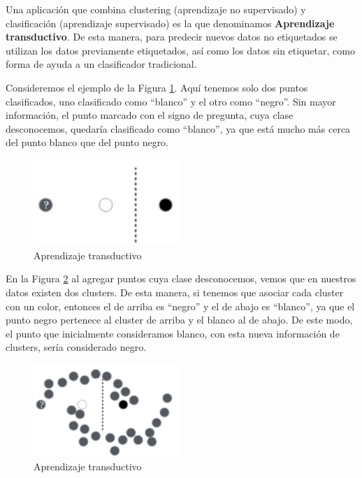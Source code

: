 \documentclass[12pt,a4paper]{article}
\begin{document}
\begin{sloppypar}
Una aplicación que combina clustering (aprendizaje no supervisado) y clasificación (aprendizaje supervisado) es la que denominamos \textbf{Aprendizaje transductivo}\cite{aprendiz_transd}\cite{apunte_uba}. De esta manera, para predecir nuevos datos no etiquetados se utilizan los datos previamente etiquetados, así como los datos sin etiquetar, como forma de ayuda a un clasificador tradicional.

Consideremos el ejemplo de la Figura \ref{fig:Transductivo_1}. Aquí tenemos solo dos puntos clasificados, uno clasificado como ``blanco'' y el otro como ``negro''. Sin mayor información, el punto marcado con el signo de pregunta, cuya clase desconocemos, quedaría clasificado como ``blanco'', ya que está mucho más cerca del punto blanco que del punto negro.

\begin{figure}[H]    %
  \centering
  \includegraphics[width=0.5\textwidth]{images/Transductivo_1.png}
  \caption{Aprendizaje transductivo}  
  \label{fig:Transductivo_1}
\end{figure}

En la Figura \ref{fig:Transductivo_2} al agregar puntos cuya clase desconocemos, vemos que en nuestros datos existen dos clusters. De esta manera, si tenemos que asociar cada cluster con un color, entonces el de arriba es ``negro'' y el de abajo es ``blanco'', ya que el punto negro pertenece al cluster de arriba y el blanco al de abajo. De este modo, el punto que inicialmente consideramos blanco, con esta nueva información de clusters, sería considerado negro.

\begin{figure}[H]    %
  \centering
  \includegraphics[width=0.5\textwidth]{images/Transductivo_2.png}
  \caption{Aprendizaje transductivo}  
  \label{fig:Transductivo_2}
\end{figure}


\end{sloppypar}
\end{document}
